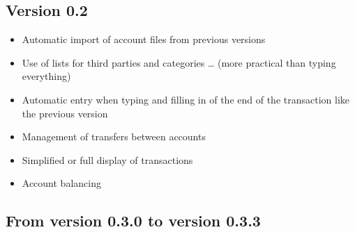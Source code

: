 \subsection{Version 0.2}

\begin{itemize}
	\item Automatic import of account files from previous versions%
	\item Use of lists for third parties and categories \dots{} (more practical than typing everything)%
	\item Automatic entry when typing and filling in of the end of the transaction like the previous version%
	\item Management of transfers between accounts%
	\item Simplified or full display of transactions%
	\item Account balancing%
\end{itemize}

\subsection{From version 0.3.0 to version 0.3.3}%

